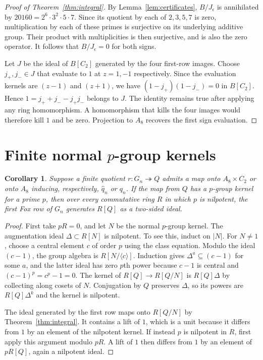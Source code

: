 \documentclass[11pt]{article}
\newtheorem{corollary}[theorem]{Corollary}
\begin{document}
\begin{proof}[Proof of Theorem~\ref{thm:integral}]
By Lemma~\ref{lem:certificates}, $B/J_\epsilon$ is annihilated by
$20160=2^6\cdot3^2\cdot5\cdot7$. Since its quotient by each of
$2,3,5,7$ is zero, multiplication by each of these primes is
surjective on its underlying additive group. Their product with
multiplicities is then surjective, and is also the zero operator.
It follows that $B/J_\epsilon=0$ for both signs.

Let $J$ be the ideal of $B[C_2]$ generated by the four first-row images.
Choose $j_+,j_-\in J$ that evaluate to $1$ at $z=1,-1$ respectively.
Since the evaluation kernels are $(z-1)$ and $(z+1)$, we have
$(1-j_+)(1-j_-)=0$ in $B[C_2]$. Hence
$1=j_++j_--j_+j_-$ belongs to $J$. The identity remains true after
applying any ring homomorphism. A homomorphism that kills the four
images would therefore kill $1$ and be zero. Projection to $A_8$
recovers the first sign evaluation.
\end{proof}

\section{Finite normal \texorpdfstring{$p$}{p}-group kernels}
\begin{corollary}\label{cor:pgroup}
Suppose a finite quotient $r\colon G_n\twoheadrightarrow Q$ admits
a map onto $A_8\times C_2$ or onto $A_8$ inducing, respectively,
$\widehat q_n$ or $q_n$. If the map from $Q$ has a $p$-group kernel for a prime $p$,
then over every commutative ring $R$ in which $p$ is nilpotent, the
first Fox row of $G_n$ generates $R[Q]$ as a two-sided ideal.
\end{corollary}
\begin{proof}
First take $pR=0$, and let $N$ be the normal $p$-group kernel.
The augmentation ideal $\Delta\subset R[N]$ is nilpotent. To see this,
induct on $|N|$. For $N\ne1$, choose a central element $c$ of order $p$
using the class equation. Modulo the ideal $(c-1)$, the group algebra
is $R[N/\langle c\rangle]$. Induction gives $\Delta^a\subseteq(c-1)$
for some $a$, and the latter ideal has zero $p$th power because
$c-1$ is central and $(c-1)^p=c^p-1=0$.
The kernel of $R[Q]\to R[Q/N]$ is $R[Q]\Delta$ by collecting along
cosets of $N$. Conjugation by $Q$ preserves $\Delta$, so its powers
are $R[Q]\Delta^k$ and the kernel is nilpotent.

The ideal generated by the first row maps onto $R[Q/N]$ by
Theorem~\ref{thm:integral}. It contains a lift of $1$, which is a
unit because it differs from $1$ by an element of the nilpotent
kernel. If instead $p$ is nilpotent in $R$, first apply this argument
modulo $pR$. A lift of $1$ then differs from $1$ by an element of
$pR[Q]$, again a nilpotent ideal.
\end{proof}
\end{document}
